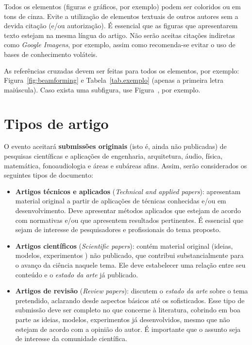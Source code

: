 \documentclass[12pt, a4paper, twoside, onecolumn]{article}
\begin{document}
Todos os elementos (figuras e gráficos, por exemplo) podem ser coloridos ou em tons de cinza. Evite a utilização de elementos textuais de outros autores sem a devida citação (e/ou autorização). É essencial que as figuras que apresentarem texto estejam na mesma língua do artigo. Não serão aceitas citações indiretas como \textit{Google Imagens}, por exemplo, assim como recomenda-se evitar o uso de bases de conhecimento voláteis.

\enlargethispage{2mm}

As referências cruzadas devem ser feitas para todos os elementos, por exemplo: Figura~\ref{fig:beamforming} e Tabela~\ref{tab.exemplo} (apenas a primeira letra maiúscula). Caso exista uma subfigura, use Figura~, por exemplo.


\section{Tipos de artigo}

O evento aceitará \textbf{submissões originais} (isto é, ainda não publicadas) de pesquisas científicas e aplicações de engenharia, arquitetura, áudio, física, matemática, fonoaudiologia e áreas e subáreas afins. Assim, serão considerados os seguintes tipos de documento:
%
\begin{itemize}[noitemsep,topsep=0ex] \itemsep=7pt
	\item \textbf{Artigos técnicos e aplicados} (\textit{Technical and applied papers}):
	apresentam material original a partir de aplicações de técnicas conhecidas e/ou em desenvolvimento. Deve apresentar métodos aplicados que estejam de acordo com normativas e/ou que apresentem resultados pertinentes. É essencial que sejam de interesse de pesquisadores e profissionais do tema proposto.
	
	\item \textbf{Artigos científicos} (\textit{Scientific papers}): 
	contém material original (ideias, modelos, experimentos \etc) não publicado, que contribui substancialmente para o avanço da ciência naquele tema. Ele deve estabelecer uma relação entre seu conteúdo e o \textit{estado da arte} já publicado. 

	\item \textbf{Artigos de revisão} (\textit{Review papers}):
	discutem o \textit{estado da arte} sobre o tema pretendido, aclarando desde aspectos básicos até os sofisticados. Esse tipo de submissão deve ser completo no que concerne à literatura, cobrindo em boa parte as ideias, modelos, experimentos \etc já desenvolvidos, mesmo que não estejam de acordo com a opinião do autor. É importante que o assunto seja de interesse da comunidade científica.	
\end{itemize}
\end{document}
